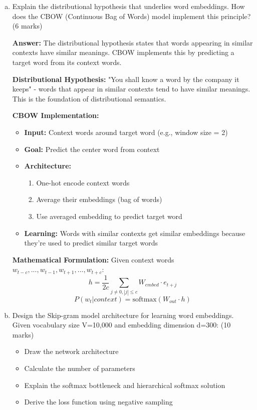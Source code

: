 \documentclass[12pt]{article}
\newcommand{\answer}[1]{{\color{answercolor}\textbf{Answer:} #1}}
\newcommand{\explanation}[1]{{\color{explanationcolor}#1}}
\begin{document}
\begin{enumerate}[(a)]
    \item Explain the distributional hypothesis that underlies word embeddings. How does the CBOW (Continuous Bag of Words) model implement this principle? \hfill (6 marks)
    
    \answer{The distributional hypothesis states that words appearing in similar contexts have similar meanings. CBOW implements this by predicting a target word from its context words.}
    
    \explanation{
    \textbf{Distributional Hypothesis:}
    "You shall know a word by the company it keeps" - words that appear in similar contexts tend to have similar meanings. This is the foundation of distributional semantics.
    
    \textbf{CBOW Implementation:}
    \begin{itemize}
        \item \textbf{Input:} Context words around target word (e.g., window size = 2)
        \item \textbf{Goal:} Predict the center word from context
        \item \textbf{Architecture:} 
        \begin{enumerate}
            \item One-hot encode context words
            \item Average their embeddings (bag of words)
            \item Use averaged embedding to predict target word
        \end{enumerate}
        \item \textbf{Learning:} Words with similar contexts get similar embeddings because they're used to predict similar target words
    \end{itemize}
    
    \textbf{Mathematical Formulation:}
    Given context words $w_{t-c}, ..., w_{t-1}, w_{t+1}, ..., w_{t+c}$:
    $$h = \frac{1}{2c} \sum_{j \neq 0, |j| \leq c} W_{embed} \cdot e_{t+j}$$
    $$P(w_t | context) = \text{softmax}(W_{out} \cdot h)$$
    }
    
    \item Design the Skip-gram model architecture for learning word embeddings. Given vocabulary size V=10,000 and embedding dimension d=300: \hfill (10 marks)
    \begin{itemize}
        \item Draw the network architecture
        \item Calculate the number of parameters
        \item Explain the softmax bottleneck and hierarchical softmax solution
        \item Derive the loss function using negative sampling
    \end{itemize}
    

\end{enumerate}
\end{document}
